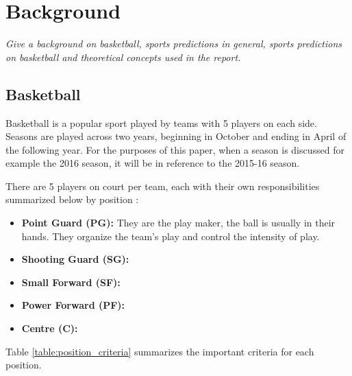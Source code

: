\chapter{Background}

\textit{Give a background on basketball, sports predictions in general, sports predictions on basketball and theoretical concepts used in the report.}

\section{Basketball}
Basketball is a popular sport played by teams with 5 players on each side.  Seasons are played across two years, beginning in October and ending in April of the following year.  For the purposes of this paper, when a season is discussed for example the 2016 season, it will be in reference to the 2015-16 season.

There are 5 players on court per team, each with their own responsibilities summarized below by position \cite{player_criteria}:

\begin{itemize}
	\item \textbf{Point Guard (PG):} They are the play maker, the ball is usually in their hands.  They organize the team's play and control the intensity of play.
	\item \textbf{Shooting Guard (SG):} 
	\item \textbf{Small Forward (SF):}
	\item \textbf{Power Forward (PF):}
	\item \textbf{Centre (C):}
\end{itemize}

Table \ref{table:position_criteria} summarizes the important criteria for each position.

